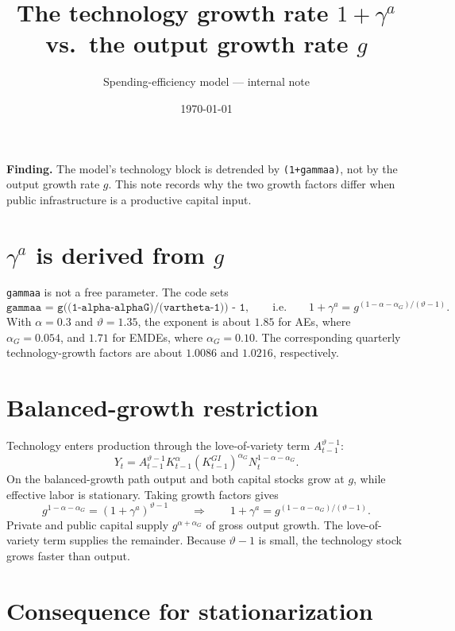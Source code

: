 \documentclass[11pt]{article}
\title{The technology growth rate $1+\gamma^{a}$ vs.\ the output growth rate $g$}
\author{Spending-efficiency model --- internal note}
\date{\today}
\begin{document}
\maketitle

\noindent
\textbf{Finding.} The model's technology block is detrended by
\texttt{(1+gammaa)}, not by the output growth rate $g$. This note records why
the two growth factors differ when public infrastructure is a productive capital
input.

\section{$\gamma^{a}$ is derived from $g$}

\texttt{gammaa} is not a free parameter. The code sets
\begin{equation}
    \texttt{gammaa = g\^{}((1-alpha-alphaG)/(vartheta-1)) - 1},
    \qquad\text{i.e.}\qquad
    1+\gamma^{a}=g^{(1-\alpha-\alpha_G)/(\vartheta-1)}.
\end{equation}
With $\alpha=0.3$ and $\vartheta=1.35$, the exponent is about $1.85$ for
AEs, where $\alpha_G=0.054$, and $1.71$ for EMDEs, where $\alpha_G=0.10$.
The corresponding quarterly technology-growth factors are about $1.0086$ and
$1.0216$, respectively.

\section{Balanced-growth restriction}

Technology enters production through the love-of-variety term
$A_{t-1}^{\vartheta-1}$:
\begin{equation}
    Y_t=A_{t-1}^{\vartheta-1}K_{t-1}^{\alpha}
        \left(K^{GI}_{t-1}\right)^{\alpha_G}N_t^{1-\alpha-\alpha_G}.
\end{equation}
On the balanced-growth path output and both capital stocks grow at $g$, while
effective labor is stationary. Taking growth factors gives
\begin{equation}
    g^{1-\alpha-\alpha_G}
    =\left(1+\gamma^{a}\right)^{\vartheta-1}
    \qquad\Longrightarrow\qquad
    1+\gamma^{a}=g^{(1-\alpha-\alpha_G)/(\vartheta-1)}.
\end{equation}
Private and public capital supply $g^{\alpha+\alpha_G}$ of gross output growth.
The love-of-variety term supplies the remainder. Because $\vartheta-1$ is small,
the technology stock grows faster than output.

\section{Consequence for stationarization}
\end{document}
